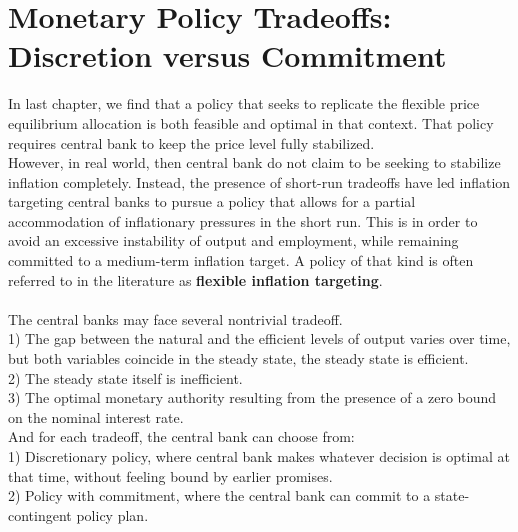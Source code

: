 \documentclass{article}
\numberwithin{equation}{section}
\begin{document}
\newpage %
\section{Monetary Policy Tradeoffs: Discretion versus Commitment}
In last chapter, we find that a policy that seeks to replicate the flexible price equilibrium allocation is both feasible and optimal in that context. That policy requires central bank to keep the price level fully stabilized.\\
However, in real world, then central bank do not claim to be seeking to stabilize inflation completely. Instead, the presence of short-run tradeoffs have led inflation targeting central banks to pursue a policy that allows for a partial accommodation of inflationary pressures in the short run. This is in order to avoid an excessive instability of output and employment, while remaining committed to a medium-term inflation target. A policy of that kind is often referred to in the literature as \textbf{flexible inflation targeting}.\\\\
The central banks may face several nontrivial tradeoff.\\
1) The gap between the natural and the efficient levels of output varies over time, but both variables coincide in the steady state, the steady state is efficient.\\
2) The steady state itself is inefficient.\\
3) The optimal monetary authority resulting from the presence of a zero bound on the nominal interest rate.\\
And for each tradeoff, the central bank can choose from:\\
1) Discretionary policy, where central bank makes whatever decision is optimal at that time, without feeling bound by earlier promises.\\
2) Policy with commitment, where the central bank can commit to a state-contingent policy plan.
\end{document}
